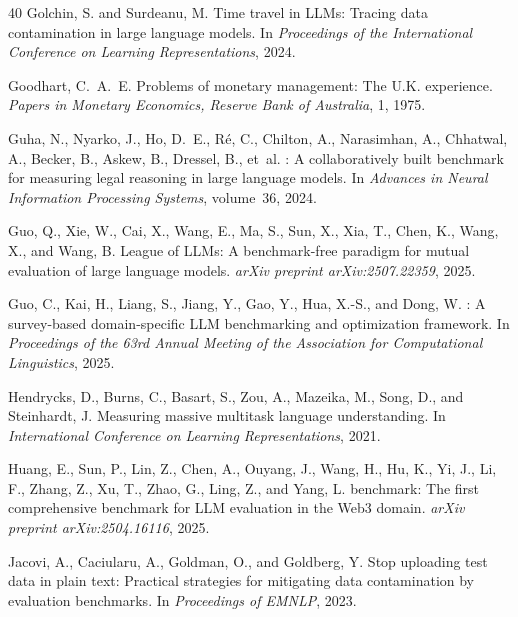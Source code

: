 \documentclass[11pt,a4paper]{article}
\begin{document}
\begin{thebibliography}{40}
Golchin, S. and Surdeanu, M.
\newblock Time travel in {LLMs}: Tracing data contamination in large language models.
\newblock In \emph{Proceedings of the International Conference on Learning Representations}, 2024.

Goodhart, C.~A.~E.
\newblock Problems of monetary management: The {U.K.} experience.
\newblock \emph{Papers in Monetary Economics, Reserve Bank of Australia}, 1, 1975.

Guha, N., Nyarko, J., Ho, D.~E., R\'{e}, C., Chilton, A., Narasimhan, A., Chhatwal, A., Becker, B., Askew, B., Dressel, B., et~al.
: A collaboratively built benchmark for measuring legal reasoning in large language models.
\newblock In \emph{Advances in Neural Information Processing Systems}, volume~36, 2024.

Guo, Q., Xie, W., Cai, X., Wang, E., Ma, S., Sun, X., Xia, T., Chen, K., Wang, X., and Wang, B.
\newblock League of {LLMs}: A benchmark-free paradigm for mutual evaluation of large language models.
\newblock \emph{arXiv preprint arXiv:2507.22359}, 2025.

Guo, C., Kai, H., Liang, S., Jiang, Y., Gao, Y., Hua, X.-S., and Dong, W.
: A survey-based domain-specific {LLM} benchmarking and optimization framework.
\newblock In \emph{Proceedings of the 63rd Annual Meeting of the Association for Computational Linguistics}, 2025.

Hendrycks, D., Burns, C., Basart, S., Zou, A., Mazeika, M., Song, D., and Steinhardt, J.
\newblock Measuring massive multitask language understanding.
\newblock In \emph{International Conference on Learning Representations}, 2021.

Huang, E., Sun, P., Lin, Z., Chen, A., Ouyang, J., Wang, H., Hu, K., Yi, J., Li, F., Zhang, Z., Xu, T., Zhao, G., Ling, Z., and Yang, L.
 benchmark: The first comprehensive benchmark for {LLM} evaluation in the {Web3} domain.
\newblock \emph{arXiv preprint arXiv:2504.16116}, 2025.

Jacovi, A., Caciularu, A., Goldman, O., and Goldberg, Y.
\newblock Stop uploading test data in plain text: Practical strategies for mitigating data contamination by evaluation benchmarks.
\newblock In \emph{Proceedings of EMNLP}, 2023.


\end{thebibliography}
\end{document}
